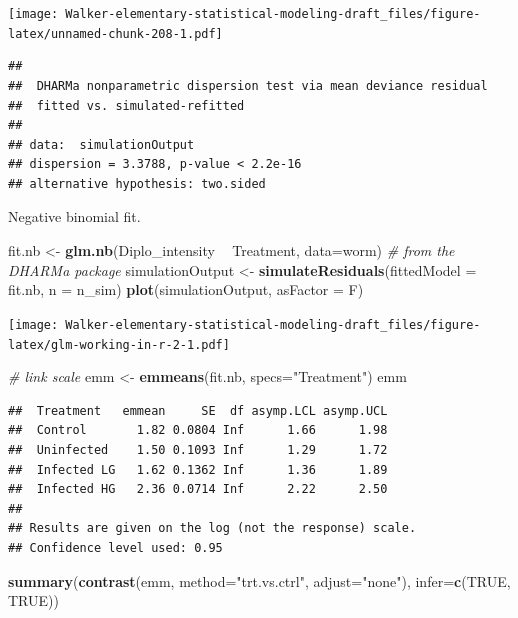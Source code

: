 \documentclass[]{book}
\newenvironment{Shaded}{\begin{snugshade}}{\end{snugshade}}
\newcommand{\CommentTok}[1]{\textcolor[rgb]{0.56,0.35,0.01}{\textit{#1}}}
\newcommand{\DataTypeTok}[1]{\textcolor[rgb]{0.13,0.29,0.53}{#1}}
\newcommand{\KeywordTok}[1]{\textcolor[rgb]{0.13,0.29,0.53}{\textbf{#1}}}
\newcommand{\NormalTok}[1]{#1}
\newcommand{\OperatorTok}[1]{\textcolor[rgb]{0.81,0.36,0.00}{\textbf{#1}}}
\newcommand{\OtherTok}[1]{\textcolor[rgb]{0.56,0.35,0.01}{#1}}
\newcommand{\StringTok}[1]{\textcolor[rgb]{0.31,0.60,0.02}{#1}}
\begin{document}
\texttt{[image: Walker-elementary-statistical-modeling-draft\_files/figure-latex/unnamed-chunk-208-1.pdf]}

\begin{verbatim}
## 
##  DHARMa nonparametric dispersion test via mean deviance residual
##  fitted vs. simulated-refitted
## 
## data:  simulationOutput
## dispersion = 3.3788, p-value < 2.2e-16
## alternative hypothesis: two.sided
\end{verbatim}

Negative binomial fit.

\begin{Shaded}
\begin{Highlighting}[]
\NormalTok{fit.nb <-}\StringTok{ }\KeywordTok{glm.nb}\NormalTok{(Diplo_intensity }\OperatorTok{~}\StringTok{ }\NormalTok{Treatment, }\DataTypeTok{data=}\NormalTok{worm)}
\CommentTok{# from the DHARMa package}
\NormalTok{  simulationOutput <-}\StringTok{ }\KeywordTok{simulateResiduals}\NormalTok{(}\DataTypeTok{fittedModel =}\NormalTok{ fit.nb, }\DataTypeTok{n =}\NormalTok{ n_sim)}
  \KeywordTok{plot}\NormalTok{(simulationOutput, }\DataTypeTok{asFactor =}\NormalTok{ F)}
\end{Highlighting}
\end{Shaded}

\texttt{[image: Walker-elementary-statistical-modeling-draft\_files/figure-latex/glm-working-in-r-2-1.pdf]}

\begin{Shaded}
\begin{Highlighting}[]
\CommentTok{# link scale}
\NormalTok{emm <-}\StringTok{ }\KeywordTok{emmeans}\NormalTok{(fit.nb, }\DataTypeTok{specs=}\StringTok{"Treatment"}\NormalTok{)}
\NormalTok{emm}
\end{Highlighting}
\end{Shaded}

\begin{verbatim}
##  Treatment   emmean     SE  df asymp.LCL asymp.UCL
##  Control       1.82 0.0804 Inf      1.66      1.98
##  Uninfected    1.50 0.1093 Inf      1.29      1.72
##  Infected LG   1.62 0.1362 Inf      1.36      1.89
##  Infected HG   2.36 0.0714 Inf      2.22      2.50
## 
## Results are given on the log (not the response) scale. 
## Confidence level used: 0.95
\end{verbatim}

\begin{Shaded}
\begin{Highlighting}[]
\KeywordTok{summary}\NormalTok{(}\KeywordTok{contrast}\NormalTok{(emm, }\DataTypeTok{method=}\StringTok{"trt.vs.ctrl"}\NormalTok{, }\DataTypeTok{adjust=}\StringTok{"none"}\NormalTok{), }\DataTypeTok{infer=}\KeywordTok{c}\NormalTok{(}\OtherTok{TRUE}\NormalTok{, }\OtherTok{TRUE}\NormalTok{))}
\end{Highlighting}
\end{Shaded}
\end{document}
